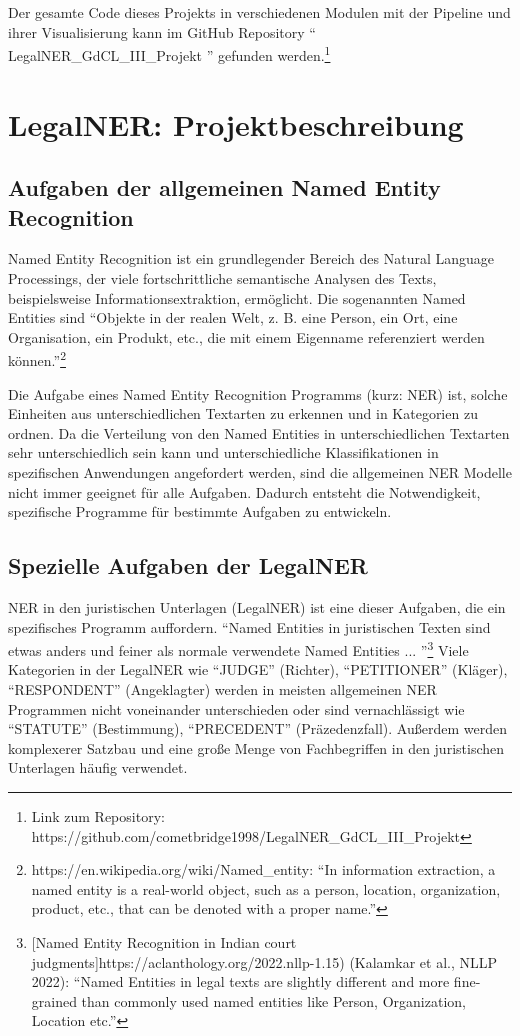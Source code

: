 \documentclass[paper=A4, ngerman, fontsize=12pt]{article}
\begin{document}
	\index Der gesamte Code dieses Projekts in verschiedenen Modulen mit der Pipeline und ihrer Visualisierung kann im GitHub Repository \enquote{ LegalNER\_GdCL\_III\_Projekt
	} gefunden werden.\footnote{Link zum Repository: https://github.com/cometbridge1998/LegalNER\_GdCL\_III\_Projekt}
	
	\section{LegalNER: Projektbeschreibung}
	\subsection{Aufgaben der allgemeinen Named Entity Recognition}
	\noindent
	Named Entity Recognition ist ein grundlegender Bereich des Natural Language Processings, der viele fortschrittliche semantische Analysen des Texts, beispielsweise Informationsextraktion, ermöglicht. Die sogenannten Named Entities sind \enquote{Objekte in der realen Welt, z. B. eine Person, ein Ort, eine Organisation, ein Produkt, etc., die mit einem Eigenname referenziert werden können.}\footnote{https://en.wikipedia.org/wiki/Named\_entity: \enquote{In information extraction, a named entity is a real-world object, such as a person, location, organization, product, etc., that can be denoted with a proper name.}}
	
	Die Aufgabe eines Named Entity Recognition Programms (kurz: NER) ist, solche Einheiten aus unterschiedlichen Textarten zu erkennen und in Kategorien zu ordnen. Da die Verteilung von den Named Entities in unterschiedlichen Textarten sehr unterschiedlich sein kann und unterschiedliche Klassifikationen in spezifischen Anwendungen angefordert werden, sind die allgemeinen NER Modelle nicht immer geeignet für alle Aufgaben. Dadurch entsteht die Notwendigkeit, spezifische Programme für bestimmte Aufgaben zu entwickeln. 
	
	\subsection{Spezielle Aufgaben der LegalNER}
	\noindent
	NER in den juristischen Unterlagen (LegalNER) ist eine dieser Aufgaben, die ein spezifisches Programm auffordern.  \enquote{Named Entities in juristischen Texten sind etwas anders und feiner als normale verwendete Named Entities ... }\footnote{[Named Entity Recognition in Indian court judgments]https://aclanthology.org/2022.nllp-1.15) (Kalamkar et al., NLLP 2022): \enquote{Named Entities in legal texts are slightly different and more fine-grained than commonly used named entities like Person, Organization, Location etc.}} Viele Kategorien in der LegalNER wie \enquote{JUDGE} (Richter), \enquote{PETITIONER} (Kläger), \enquote{RESPONDENT} (Angeklagter) werden in meisten allgemeinen NER Programmen nicht voneinander unterschieden oder sind vernachlässigt wie \enquote{STATUTE} (Bestimmung), \enquote{PRECEDENT} (Präzedenzfall). Außerdem werden komplexerer Satzbau und eine große Menge von Fachbegriffen in den juristischen Unterlagen häufig verwendet. 
	
\end{document}
